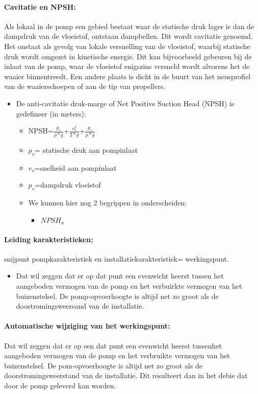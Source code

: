 \documentclass[12pt]{article}
\begin{document}
\paragraph{Cavitatie en NPSH:}
Als lokaal in de pomp een gebied bestaat waar de statische druk lager is dan de dampdruk van de vloeistof, ontstaan dampbellen. Dit wordt cavitatie genoemd. Het onstaat als gevolg van lokale versnelling van de vloeistof, waarbij statische druk wordt omgezet in kinetische energie. Dit kan bijvoorbeeld gebeuren bij de inlaat van de pomp, waar de vloeistof enigszins versneld wordt alvorens het de waaier binnentreedt. Een andere plaats is dicht in de buurt van het neusprofiel van de waaierschoepen of aan de tip van propellers.
\begin{itemize}
    \item De anti-cavitatie druk-marge of Net Positive Suction Head (NPSH) is gedefineer (in meters):\begin{itemize}
        \item NPSH=$\frac{p_s}{\rho*g}$+$\frac{v_s^2}{2*g}$+$\frac{p_v}{\rho*g}$
        \item $p_s$= statische druk aan pompinlaat
        \item $v_s$=snelheid aan pompinlaat
        \item $p_v$=dampdruk vloeistof
        \item We kunnen hier nog 2 begrippen in onderscheiden:\begin{itemize}
            \item $NPSH_a$
        \end{itemize}
    \end{itemize}
\end{itemize}
\paragraph{Leiding karakteristieken:}
snijpunt pompkarakteristiek en installatiekarakteristiek= werkingspunt.
\begin{itemize}
    \item Dat wil zeggen dat er op dat punt een evenwicht heerst tussen het aangeboden vermogen van de pomp en het verbuirkte vermogen van het buizenstelsel. De pomp-opvoerhoogte is altijd net zo groot als de doostromingsweersand van de installatie.
\end{itemize}
\paragraph{Automatische wijziging van het werkingspunt:}
Dat wil zeggen dat er op een dat punt een evenwicht heerst tussenhet aangeboden vermogen van de pomp en het verbruikte vermogen van het buizenstelsel. De pom-opvoerhoogte is altijd net zo groot als de doorstromingsweerstand van de installatie. Dit resulteert dan in het debie dat door de pomp geleverd kan worden.
\end{document}
